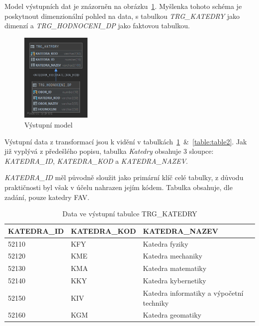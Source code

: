 Model výstupních dat je znázorněn na obrázku~\ref{fig:trg-model}.
Myšlenka tohoto schéma je poskytnout dimenzionální pohled na data, s tabulkou \textit{TRG\_KATEDRY} jako dimenzí a \textit{TRG\_HODNOCENI\_DP} jako faktovou tabulkou.

\begin{figure}[htb]
    \centering
    \includegraphics[width=0.3\textwidth]{graphs/trg-model.png}
    \caption{Výstupní model}
    \label{fig:trg-model}
\end{figure}
\FloatBarrier

Výstupní data z transformací jsou k vidění v tabulkách~\ref{table:table1}~\&~\ref{table:table2}.
Jak již vyplývá z předešlého popisu, tabulka \textit{Katedry} obsahuje 3 sloupce: \textit{KATEDRA\_ID}, \textit{KATEDRA\_KOD} a \textit{KATEDRA\_NAZEV}.

\textit{KATEDRA\_ID} měl původně sloužit jako primární klíč celé tabulky, z důvodu praktičnosti byl však v účelu nahrazen jejím kódem.
Tabulka obsahuje, dle zadání, pouze katedry FAV.

\begin{table}[htb]
    \centering

    \begin{tabular}{lll}
        \toprule

        KATEDRA\_ID & KATEDRA\_KOD  & KATEDRA\_NAZEV                            \\ \midrule
        52110       & KFY           & Katedra fyziky                            \\
        52120       & KME           & Katedra mechaniky                         \\
        52130       & KMA           & Katedra matematiky                        \\
        52140       & KKY           & Katedra kybernetiky                       \\
        52150       & KIV           & Katedra informatiky a výpočetní techniky  \\
        52160       & KGM           & Katedra geomatiky                         \\
          
        \bottomrule
    \end{tabular}

    \caption{Data ve výstupní tabulce TRG\_KATEDRY}
    \label{table:table1}
\end{table}
\FloatBarrier

